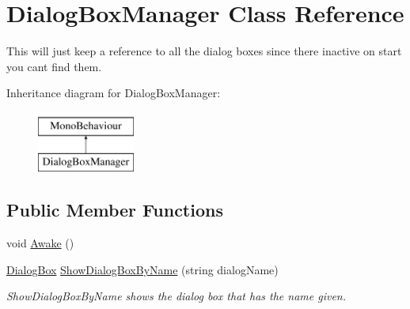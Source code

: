 \hypertarget{class_dialog_box_manager}{}\section{Dialog\+Box\+Manager Class Reference}
\label{class_dialog_box_manager}


This will just keep a reference to all the dialog boxes since there inactive on start you cant find them.  


Inheritance diagram for Dialog\+Box\+Manager\+:\begin{figure}[H]
\begin{center}
\leavevmode
\includegraphics[height=2.000000cm]{class_dialog_box_manager}
\end{center}
\end{figure}
\subsection*{Public Member Functions}
\begin{DoxyCompactItemize}
\item 
void \hyperlink{class_dialog_box_manager_a28224e3447ddefd0e824d2038630136b}{Awake} ()
\item 
\hyperlink{class_dialog_box}{Dialog\+Box} \hyperlink{class_dialog_box_manager_a1ae6b99dbcda36d12d2588efdfd04cbb}{Show\+Dialog\+Box\+By\+Name} (string dialog\+Name)
\begin{DoxyCompactList}\small\item\em Show\+Dialog\+Box\+By\+Name shows the dialog box that has the name given. \end{DoxyCompactList}\end{DoxyCompactItemize}
